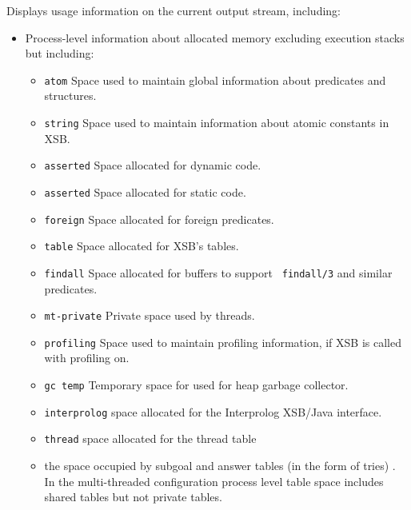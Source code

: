 \begin{description}

%
Displays usage information on the current output stream, including: 
\begin{itemize} 
\item Process-level information about allocated memory excluding
  execution stacks but including: 
\begin{itemize}
\item {\tt atom} Space used to maintain global information about
  predicates and structures. 
%
\item {\tt string} Space used to maintain information about atomic
  constants in XSB.
%
\item {\tt asserted} Space allocated for dynamic code.
%
\item {\tt asserted} Space allocated for static code.
%
\item {\tt foreign} Space allocated for foreign predicates.
%
\item {\tt table} Space allocated for XSB's tables.
%
\item {\tt findall} Space allocated for buffers to support {\tt
  findall/3} and similar predicates.
%
\item {\tt mt-private} Private space used by threads.
%
\item {\tt profiling} Space used to maintain profiling information, if
  XSB is called with profiling on.
%
\item {\tt gc temp} Temporary space for used for heap garbage
  collector.
%
\item {\tt interprolog} space allocated for the Interprolog XSB/Java
  interface.
%
\item {\tt thread} space allocated for the thread table
%
\item the space occupied by subgoal and answer tables (in the form of
  tries) \cite{RRSSW98,CuSW99b,TST99}.  In the multi-threaded
  configuration process level table space includes shared tables but
  not private tables.
\end{itemize}


\end{itemize}
\end{description}
